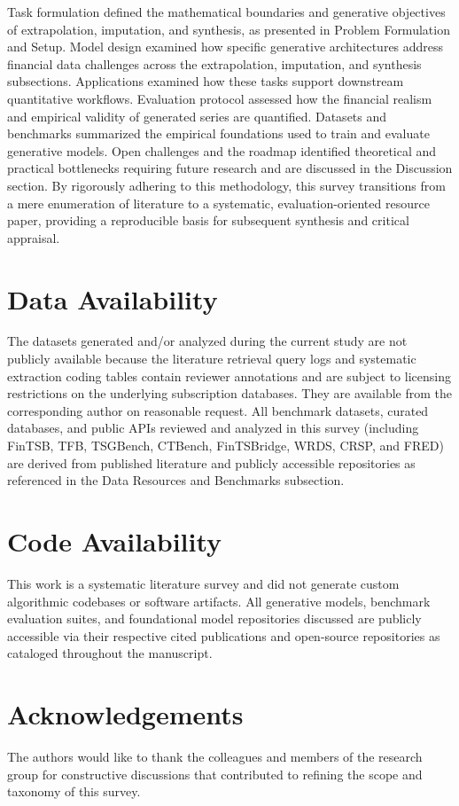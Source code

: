 \documentclass[11pt,a4paper]{article}
\begin{document}
Task formulation defined the mathematical boundaries and generative objectives of extrapolation, imputation, and synthesis, as presented in Problem Formulation and Setup. Model design examined how specific generative architectures address financial data challenges across the extrapolation, imputation, and synthesis subsections. Applications examined how these tasks support downstream quantitative workflows. Evaluation protocol assessed how the financial realism and empirical validity of generated series are quantified. Datasets and benchmarks summarized the empirical foundations used to train and evaluate generative models. Open challenges and the roadmap identified theoretical and practical bottlenecks requiring future research and are discussed in the Discussion section.
By rigorously adhering to this methodology, this survey transitions from a mere enumeration of literature to a systematic, evaluation-oriented resource paper, providing a reproducible basis for subsequent synthesis and critical appraisal.


\section*{Data Availability}
The datasets generated and/or analyzed during the current study are not publicly available because the literature retrieval query logs and systematic extraction coding tables contain reviewer annotations and are subject to licensing restrictions on the underlying subscription databases. They are available from the corresponding author on reasonable request. All benchmark datasets, curated databases, and public APIs reviewed and analyzed in this survey (including FinTSB, TFB, TSGBench, CTBench, FinTSBridge, WRDS, CRSP, and FRED) are derived from published literature and publicly accessible repositories as referenced in the Data Resources and Benchmarks subsection.

\section*{Code Availability}
This work is a systematic literature survey and did not generate custom algorithmic codebases or software artifacts. All generative models, benchmark evaluation suites, and foundational model repositories discussed are publicly accessible via their respective cited publications and open-source repositories as cataloged throughout the manuscript.

\section*{Acknowledgements}
The authors would like to thank the colleagues and members of the research group for constructive discussions that contributed to refining the scope and taxonomy of this survey.
\end{document}
